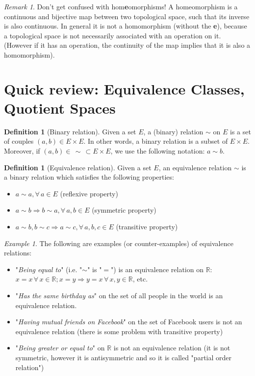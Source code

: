 \documentclass[a4paper,11pt,titlepage]{article}
\numberwithin{equation}{section}
\theoremstyle{definition}
\newtheorem{definition}[theorem]{Definition}
\theoremstyle{remark}
\newtheorem{remark}[theorem]{Remark}
\newtheorem{example}[theorem]{Example}
\newcommand{\rfield}{\mathbb{R}}
\begin{document}
\begin{remark}
Don't get confused with hom\textbf{e}omorphisms! A homeomorphism is a continuous and bijective map between two topological space, such that its inverse is also continuous. In general it is not a homomorphism (without the \textbf{e}), because a topological space is not necessarily associated with an operation on it. (However if it has an operation, the continuity of the map implies that it is also a homomorphism).
\end{remark}
\newpage

\section{Quick review: Equivalence Classes, Quotient Spaces}
\begin{definition}[Binary relation]
  Given a set $E$, a (binary) relation $\sim$ on $E$ is a set of couples $(a, b) \in E \times E$. In other words, a binary relation is a subset of $E \times E$. Moreover, if $(a, b) \in \, \sim\,  \subset E \times E$, we use the following notation: $a \sim b$.
\end{definition}

\begin{definition}[Equivalence relation]
  Given a set $E$, an equivalence relation $\sim$ is a binary relation which satisfies the following properties:
  \begin{itemize}
    \item $a \sim a, \forall\, a \in E$ (reflexive property)
    \item $a \sim b \Rightarrow b \sim a, \forall\, a, b \in E$ (symmetric property)
    \item $a \sim b, b \sim c \Rightarrow a \sim c, \forall \, a, b, c \in E$ (transitive property)
  \end{itemize}
\end{definition}

\begin{example}
  The following are examples (or counter-examples) of equivalence relations:
  \begin{itemize}
  \item "\textit{Being equal to}" (i.e. "$\sim$" is "$=$") is an equivalence relation on $\rfield$: $x=x \, \forall\, x \in \rfield; x=y \Rightarrow y=x \, \forall\, x, y \in \rfield$, etc.
  \item "\textit{Has the same birthday as}" on the set of all people in the world is an equivalence relation.
  \item "\textit{Having mutual friends on Facebook}" on the set of Facebook users is not an equivalence relation (there is some problem with transitive property)
  \item "\textit{Being greater or equal to}" on $\rfield$ is not an equivalence relation (it is not symmetric, however it is antisymmetric and so it is called "partial order relation")
\end{itemize}
\end{example}
\end{document}
